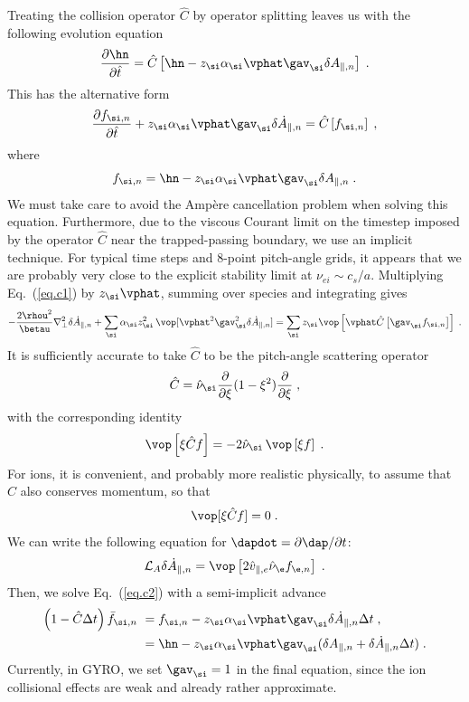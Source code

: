 Treating the collision operator $\hat{C}$ by operator splitting 
leaves us with the following evolution equation 
%
\begin{equation}
\frac{\partial\hn}{\partial\hat{t}} = 
 \hat{C}\left[\hn - z_\si \alpha_\si \vphat \gav_\si \apn \right] \; .
\label{eq.c1}
\end{equation}
%
This has the alternative form
\begin{equation}
\frac{\partial\fn}{\partial\hat{t}} + z_\si \alpha_\si \vphat 
 \gav_\si \apndot = \hat{C}\left[\fn \right] \; ,
\label{eq.c2}
\end{equation}
%
where
%
\begin{equation}
\fn = \hn - z_\si \alpha_\si \vphat \gav_\si \apn \; . 
\end{equation}
%
We must take care to avoid the Amp\`ere cancellation problem
when solving this equation.  Furthermore, due to the viscous 
Courant limit on the timestep imposed by the operator $\hat{C}$ 
near the trapped-passing boundary, we use an implicit technique.
For typical time steps and 8-point pitch-angle grids, it appears 
that we are probably very close to the explicit stability limit 
at $\nu_{ei} \sim c_s/a$. Multiplying Eq.~(\ref{eq.c1}) by 
$z_\si \vphat$, summing over species and integrating gives 
%
\begin{equation}
-\frac{2\rhou^2}{\betau} \nabla_\perp^2 \apndot + 
\sum_\si \alpha_\si z_\si^2 \, \vop[\vphat^2 \gav^2_\si\apndot] = 
 \sum_\si z_\si  
 \vop\left[ \vphat \hat{C} \left[ \gav_\si \fn \right] \right] \; .
\end{equation}
%
It is sufficiently accurate to take $\hat{C}$ to be the pitch-angle 
scattering operator 
% 
\begin{equation}
\hat{C} = \hat{\nu}_\si \frac{\partial}{\partial \xi}
(1-\xi^2) \frac{\partial}{\partial\xi} \; ,
\end{equation}
%
with the corresponding identity
%
\begin{equation}
\vop\left[ \xi \hat{C} f \right] 
 = - 2 \hat{\nu}_\si \, \vop\left[ \xi f \right]  \; .
\end{equation}
%
For ions, it is convenient, and probably more realistic physically, 
to assume that $\hat{C}$ also conserves momentum, so that 
%
\begin{equation}
\vop[ \xi \hat{C} f ] = 0 \; .
\end{equation}
%
We can write the following equation for $\dapdot = \partial\dap/\partial t$:
%
\begin{equation}
{\cal L}_A \apndot = \vop\left[ 2 \hat{v}_{\parallel,e} \hat{\nu}_\e f_{\e,n} 
\right] \; .
\end{equation}
%
Then, we solve Eq.~(\ref{eq.c2}) with a semi-implicit advance
%
\begin{align}
\left( 1- \hat{C} \Delta t \right) \bar{f}_{\si,n} 
 &~= \fn - z_\si \alpha_\si \vphat \gav_\si \apndot \Delta t \; , \\
 &~= \hn - z_\si \alpha_\si \vphat \gav_\si (\apn + \apndot \Delta t) \; .
\end{align}
%
Currently, in GYRO, we set $\gav_\si = 1$ in the final equation, 
since the ion collisional effects are weak and already rather 
approximate.

